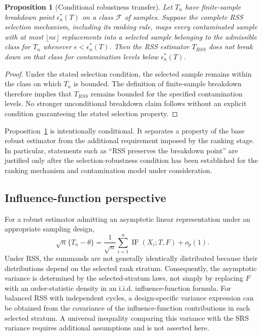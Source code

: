 \documentclass[12pt]{article}
\newtheorem{proposition}{Proposition}[section]
\begin{document}
\begin{proposition}[Conditional robustness transfer]
\label{prop:conditional_robustness}
Let $T_n$ have finite-sample breakdown point $\epsilon_n^*(T)$ on a class $\mathcal F$ of samples. Suppose the complete RSS selection mechanism, including its ranking rule, maps every contaminated sample with at most $\lfloor n\epsilon\rfloor$ replacements into a selected sample belonging to the admissible class for $T_n$ whenever $\epsilon<\epsilon_n^*(T)$. Then the RSS estimator $T_{RSS}$ does not break down on that class for contamination levels below $\epsilon_n^*(T)$.
\end{proposition}

\begin{proof}
Under the stated selection condition, the selected sample remains within the class on which $T_n$ is bounded. The definition of finite-sample breakdown therefore implies that $T_{RSS}$ remains bounded for the specified contamination levels. No stronger unconditional breakdown claim follows without an explicit condition guaranteeing the stated selection property.
\end{proof}

Proposition~\ref{prop:conditional_robustness} is intentionally conditional. It separates a property of the base robust estimator from the additional requirement imposed by the ranking stage. In particular, statements such as ``RSS preserves the breakdown point'' are justified only after the selection-robustness condition has been established for the ranking mechanism and contamination model under consideration.

\subsection{Influence-function perspective}
For a robust estimator admitting an asymptotic linear representation under an appropriate sampling design,
\[
\sqrt n\{T_n-\theta\}=\frac{1}{\sqrt n}\sum_{i=1}^n\operatorname{IF}(X_i;T,F)+o_p(1).
\]
Under RSS, the summands are not generally identically distributed because their distributions depend on the selected rank stratum. Consequently, the asymptotic variance is determined by the selected-stratum laws, not simply by replacing $F$ with an order-statistic density in an i.i.d. influence-function formula. For balanced RSS with independent cycles, a design-specific variance expression can be obtained from the covariance of the influence-function contributions in each selected stratum. A universal inequality comparing this variance with the SRS variance requires additional assumptions and is not asserted here.
\end{document}

